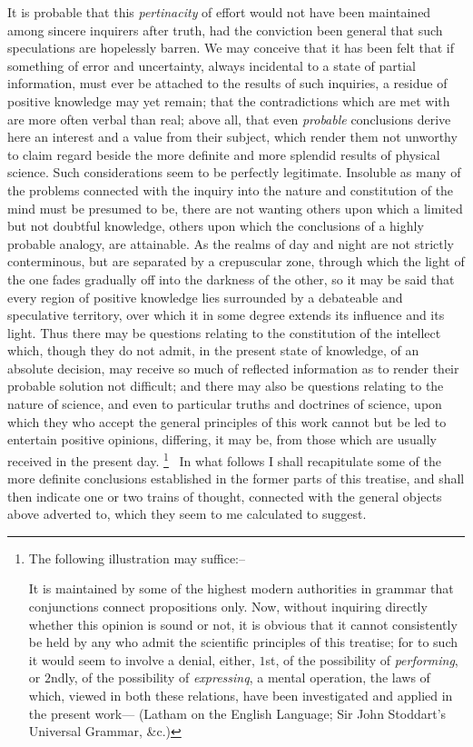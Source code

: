 \documentclass[oneside]{book}
\begin{document}
It is probable that this \emph{pertinacity} of effort would not have
been maintained among sincere inquirers after truth, had the
conviction been general that such speculations are hopelessly
barren. We may conceive that it has been felt that if something
of error and uncertainty, always incidental to a state of partial
information, must ever be attached to the results of such inquiries,
a residue of positive knowledge may yet remain; that
the contradictions which are met with are more often verbal than
real; above all, that even \emph{probable} conclusions derive here an interest
and a value from their subject, which render them not
unworthy to claim regard beside the more definite and more
splendid results of physical science. Such considerations seem
to be perfectly legitimate. Insoluble as many of the problems
connected with the inquiry into the nature and constitution of
the mind must be presumed to be, there are not wanting others
upon which a limited but not doubtful knowledge, others upon
which the conclusions of a highly probable analogy, are attainable.
As the realms of day and night are not strictly conterminous,
but are separated by a crepuscular zone, through which the
light of the one fades gradually off into the darkness of the other,
so it may be said that every region of positive knowledge lies surrounded
by a debateable and speculative territory, over which it
in some degree extends its influence and its light. Thus there
may be questions relating to the constitution of the intellect
which, though they do not admit, in the present state of
knowledge, of an absolute decision, may receive so much of reflected
information as to render their probable solution not difficult; and
there may also be questions relating to the nature of science, and
even to particular truths and doctrines of science, upon which
they who accept the general principles of this work cannot but be
led to entertain positive opinions, differing, it may be, from those
which are usually received in the present day.%
\footnote{The following illustration may suffice:--

It is maintained by some of the highest modern authorities in grammar that
conjunctions connect propositions only. Now, without inquiring directly whether this opinion is sound or not, it is obvious that it cannot consistently be held
by any who admit the scientific principles of this treatise; for to such it would
seem to involve a denial, either, $1$st, of the possibility of \emph{performing}, or $2$ndly, of
the possibility of \emph{expressinq}, a mental operation, the laws of which, viewed in
both these relations, have been investigated and applied in the present work---
(Latham on the English Language; Sir John Stoddart's Universal Grammar, \&c.)}%
\ In what follows I shall recapitulate some of the more definite conclusions
established in the former parts of this treatise, and shall then
indicate one or two trains of thought, connected with the general objects above adverted to, which they seem to me calculated
to suggest.
\end{document}
